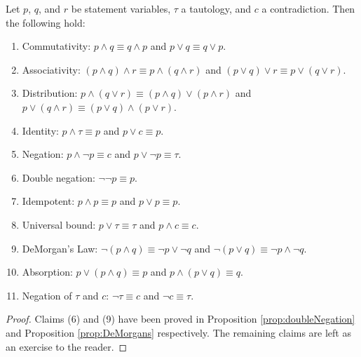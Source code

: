 \guard










\begin{thm}
\label{thm:logicalEquivalences}
  Let $p$, $q$, and $r$ be statement variables, $\tau$ a tautology, and $c$ a contradiction.
  Then the following hold:
  \begin{enumerate}
    \item Commutativity: $p\wedge q\equiv q\wedge p$ and $p\vee q\equiv q\vee p$.
    \item Associativity: $(p\wedge q)\wedge r \equiv p\wedge(q\wedge r)$ and $(p\vee q)\vee r \equiv p\vee(q\vee r)$.
    \item Distribution: $p\wedge(q\vee r)\equiv (p\wedge q)\vee(p\wedge r)$ and $p\vee(q\wedge r)\equiv (p\vee q)\wedge(p\vee r)$.
    \item Identity: $p\wedge \tau\equiv p$ and $p\vee c \equiv p$.
    \item Negation: $p\wedge\neg p \equiv c$ and $p\vee\neg p \equiv \tau$.
    \item Double negation: $\neg\neg p \equiv p$.
    \item Idempotent: $p\wedge p\equiv p$ and $p\vee p \equiv p$.
    \item Universal bound: $p\vee\tau\equiv\tau$ and $p\wedge c\equiv c $.
    \item DeMorgan's Law: $\neg(p\wedge q) \equiv \neg p \vee \neg q$ and $\neg(p\vee q) \equiv \neg p \wedge \neg q$.
    \item Absorption: $p\vee(p\wedge q)\equiv p$ and $p\wedge(p\vee q)\equiv q$.
    \item Negation of $\tau$ and $c$: $\neg\tau\equiv c$ and $\neg c \equiv \tau$.
  \end{enumerate}
\end{thm}
\begin{proof}
  Claims (6) and (9) have been proved in Proposition \ref{prop:doubleNegation} and Proposition \ref{prop:DeMorgans} respectively.
  The remaining claims are left as an exercise to the reader.
\end{proof}


